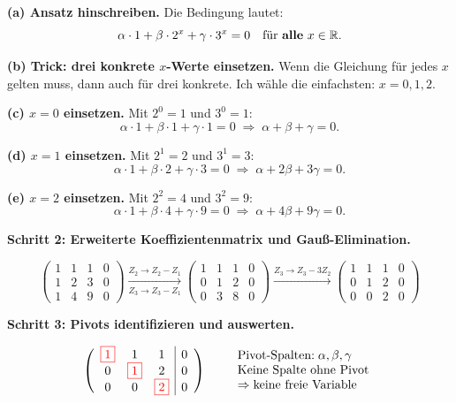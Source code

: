 \documentclass[a4paper,12pt]{article}
\newcommand{\piv}[1]{{\color{red}\boxed{#1}}}
\begin{document}
\textbf{(a) Ansatz hinschreiben.} Die Bedingung lautet:
\[
\alpha \cdot 1 + \beta \cdot 2^x + \gamma \cdot 3^x = 0 \quad \text{f\"ur \textbf{alle} } x \in \mathbb{R}.
\]

\textbf{(b) Trick: drei konkrete $x$-Werte einsetzen.} Wenn die Gleichung f\"ur jedes $x$ gelten muss, dann auch f\"ur drei konkrete. Ich w\"ahle die einfachsten: $x = 0, 1, 2$.

\textbf{(c) $x = 0$ einsetzen.} Mit $2^0 = 1$ und $3^0 = 1$:
\[
\alpha \cdot 1 + \beta \cdot 1 + \gamma \cdot 1 = 0 \;\Rightarrow\; \alpha + \beta + \gamma = 0.
\]

\textbf{(d) $x = 1$ einsetzen.} Mit $2^1 = 2$ und $3^1 = 3$:
\[
\alpha \cdot 1 + \beta \cdot 2 + \gamma \cdot 3 = 0 \;\Rightarrow\; \alpha + 2\beta + 3\gamma = 0.
\]

\textbf{(e) $x = 2$ einsetzen.} Mit $2^2 = 4$ und $3^2 = 9$:
\[
\alpha \cdot 1 + \beta \cdot 4 + \gamma \cdot 9 = 0 \;\Rightarrow\; \alpha + 4\beta + 9\gamma = 0.
\]

\textbf{Schritt 2: Erweiterte Koeffizientenmatrix und Gau\ss-Elimination.}

\[
\left(\begin{array}{ccc|c}
1 & 1 & 1 & 0 \\
1 & 2 & 3 & 0 \\
1 & 4 & 9 & 0
\end{array}\right)
\xrightarrow[Z_3 \to Z_3 - Z_1]{Z_2 \to Z_2 - Z_1}
\left(\begin{array}{ccc|c}
1 & 1 & 1 & 0 \\
0 & 1 & 2 & 0 \\
0 & 3 & 8 & 0
\end{array}\right)
\xrightarrow{Z_3 \to Z_3 - 3Z_2}
\left(\begin{array}{ccc|c}
1 & 1 & 1 & 0 \\
0 & 1 & 2 & 0 \\
0 & 0 & 2 & 0
\end{array}\right)
\]

\textbf{Schritt 3: Pivots identifizieren und auswerten.}

\[
\left(\begin{array}{ccc|c}
\piv{1} & 1 & 1 & 0 \\
0 & \piv{1} & 2 & 0 \\
0 & 0 & \piv{2} & 0
\end{array}\right)
\qquad
\begin{array}{l}
\text{Pivot-Spalten:}\; \alpha, \beta, \gamma \\
\text{Keine Spalte ohne Pivot} \\
\Rightarrow \text{keine freie Variable}
\end{array}
\]
\end{document}
